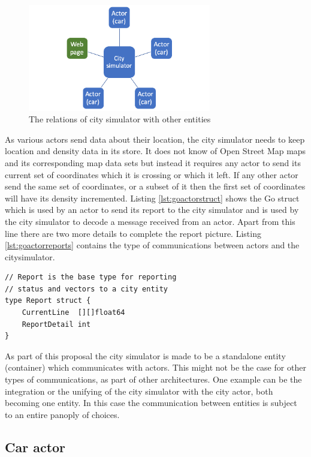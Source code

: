 \documentclass[conference]{IEEEtran}
\begin{document}
\begin{figure}
    \includegraphics[width=8cm]{CitySimulator.png}
    \centering
    \caption{The relations of city simulator with other entities}
    \label{fig:citysimrelations}
\end{figure}

As various actors send data about their location, the city simulator needs to keep location and density data in its store. It does not know of Open Street Map maps and its corresponding map data sets but instead it requires any actor to send its current set of coordinates which it is crossing or which it left. If any other actor send the same set of coordinates, or a subset of it then the first set of coordinates will have its density incremented. Listing \ref{lst:goactorstruct} shows the Go struct which is used by an actor to send its report to the city simulator and is used by the city simulator to decode a message received from an actor. Apart from this line there are two more details to complete the report picture. Listing \ref{lst:goactorreports} contains the type of communications between actors and the citysimulator.

\begin{lstlisting}[caption=Go struct for actor's report, label=lst:goactorstruct]
// Report is the base type for reporting
// status and vectors to a city entity
type Report struct {
	CurrentLine  [][]float64
	ReportDetail int
}
\end{lstlisting}

As part of this proposal the city simulator is made to be a standalone entity (container) which communicates with actors. This might not be the case for other types of communications, as part of other architectures. One example can be the integration or the unifying of the city simulator with the city actor, both becoming one entity. In this case the communication between entities is subject to an entire panoply of choices.

\subsection{Car actor}
\end{document}
